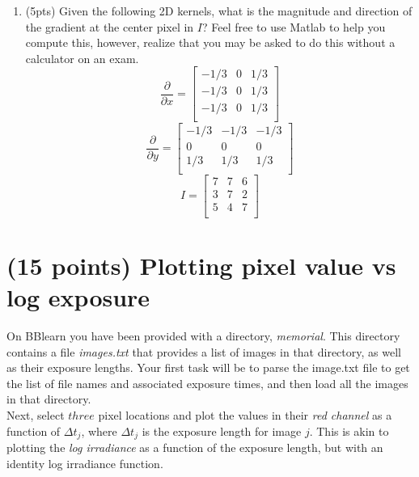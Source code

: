 \documentclass[12pt]{article}
\begin{document}
\begin{enumerate}
\item (5pts) Given the following 2D kernels, what is the magnitude and direction of the gradient at the center pixel in $I$?  Feel free to use Matlab to help you compute this, however, realize that you may be asked to do this without a calculator on an exam.
\begin{equation}
\frac{\partial}{\partial x} = \begin{bmatrix}
-1/3 & 0 & 1/3\\
-1/3 & 0 & 1/3\\
-1/3 & 0 & 1/3\\
\end{bmatrix}
\end{equation}
\begin{equation}
\frac{\partial}{\partial y} = \begin{bmatrix}
-1/3 & -1/3 & -1/3\\
0 & 0 & 0\\
1/3 & 1/3 & 1/3\\
\end{bmatrix}
\end{equation}
\begin{equation}
I=
\begin{bmatrix}
7 & 7 & 6\\
3 & 7 & 2\\
5 & 4 & 7\\
\end{bmatrix}
\end{equation}

\end{enumerate}


\newpage
\section{(15 points) Plotting pixel value vs log exposure}
On BBlearn you have been provided with a directory, \emph{memorial}.  This directory contains a file \emph{images.txt} that provides a list of images in that directory, as well as their exposure lengths.  Your first task will be to parse the image.txt file to get the list of file names and associated exposure times, and then load all the images in that directory.\\

\noindent
Next, select $three$ pixel locations and plot the values in their \emph{red channel} as a function of $\Delta t_j$, where $\Delta t_j$ is the exposure length for image $j$.  This is akin to plotting the \emph{log irradiance} as a function of the exposure length, but with an identity log irradiance function.\\
\end{document}
